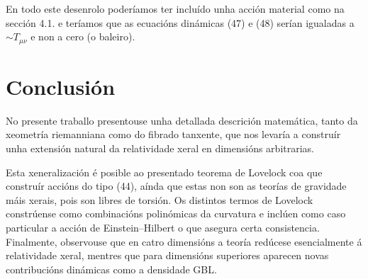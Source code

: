 En todo este desenrolo poderíamos ter incluído unha acción material como na sección 4.1. e teríamos que as ecuacións dinámicas (47) e (48) serían igualadas a $\sim T_{\mu\nu}$ e non a cero (o baleiro).
\pagestyle{apaño2}
\section{Conclusión}
No presente traballo presentouse unha detallada descrición matemática, tanto da xeometría riemanniana como do fibrado tanxente, que nos levaría a construír unha extensión natural da relatividade xeral en dimensións arbitrarias. 

Esta xeneralización é posible ao presentado teorema de Lovelock coa que construír accións do tipo (44), aínda que estas non son as teorías de gravidade máis xerais, pois son libres de torsión.
Os distintos termos de Lovelock constrúense como combinacións polinómicas da curvatura e inclúen como caso particular a acción de Einstein–Hilbert o que asegura certa consistencia.
Finalmente, observouse que en catro dimensións a teoría redúcese esencialmente á relatividade xeral, mentres que para dimensións superiores aparecen novas contribucións dinámicas como a densidade GBL.
